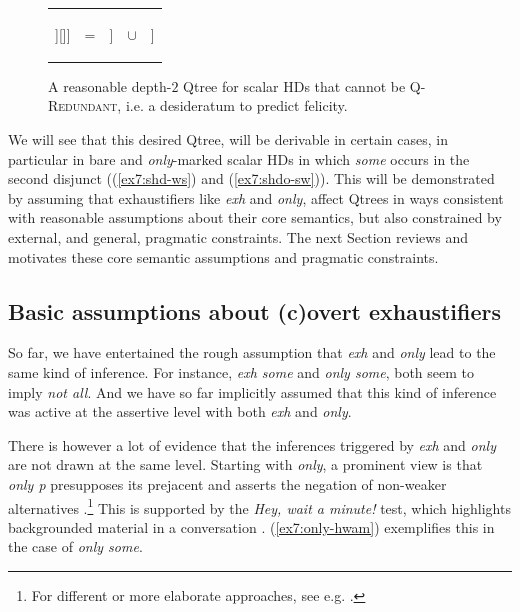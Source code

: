 \begin{figure}[H]
	\centering
	\begin{tabular}{ccccc}
		\begin{forest}
			[CS[$\neg\forall$[$\neg\exists$][\fbox{$\exists\wedge\neg\forall$}]][\fbox{$\forall$}]]
		\end{forest}
		&
		=
		&
		\begin{forest}
			[CS[$\neg\forall$][\fbox{$\forall$}]]
		\end{forest}
		&
		$\cup$
		&
		\begin{forest}
			[{CS$\cap\neg\forall$} [$\neg\exists$][\fbox{$\exists\wedge\neg\forall$}]]
		\end{forest}
	\end{tabular}
	\caption{A reasonable depth-$2$ Qtree for scalar HDs that cannot be \textsc{Q-Redundant}, i.e. a desideratum to predict felicity.}\label{fig7:qtree-desideratum}
\end{figure}

We will see that this desired Qtree, will be derivable in certain cases, in particular in bare and \textit{only}-marked scalar HDs in which \textit{some} occurs in the second disjunct ((\ref{ex7:shd-ws}) and (\ref{ex7:shdo-sw})). This will be demonstrated by assuming that exhaustifiers like \textit{exh} and \textit{only}, affect Qtrees in ways consistent with reasonable assumptions about their core semantics, but also constrained by external, and general, pragmatic constraints. The next Section reviews and motivates these core semantic assumptions and pragmatic constraints.

\subsection{Basic assumptions about (c)overt exhaustifiers}\label{sec7:exh-presupp-assumptions}

So far, we have entertained the rough assumption that \textit{exh} and \textit{only} lead to the same kind of inference. For instance, \textit{exh some} and \textit{only some}, both seem to imply \textit{not all}. And we have so far implicitly assumed that this kind of inference was active at the assertive level with both \textit{exh} and \textit{only}.

There is however a lot of evidence that the inferences triggered by \textit{exh} and \textit{only} are not drawn at the same level. Starting with \textit{only}, a prominent view is that \textit{only p} presupposes its prejacent and asserts the negation of non-weaker alternatives \citep{Horn1972,Horn1996,Rooth1985,Rooth1992,Roberts2006,Alxatib2013}.\footnote{For different or more elaborate approaches, see e.g. \citet{Atlas1993,Horn2002,Roberts2011,Crnic2024}.} This is supported by the \textit{Hey, wait a minute!} test, which highlights backgrounded material in a conversation \citep{vonFintel2004,Shannon1976}. (\ref{ex7:only-hwam}) exemplifies this in the case of \textit{only some}. 


